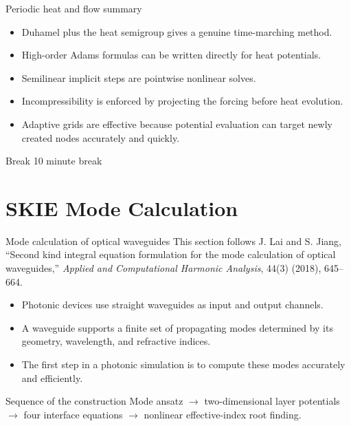 \documentclass[aspectratio=169,10pt]{beamer}
\begin{document}
\begin{frame}{Periodic heat and flow summary}
\small
\begin{itemize}
  \item Duhamel plus the heat semigroup gives a genuine time-marching method.
  \item High-order Adams formulas can be written directly for heat potentials.
  \item Semilinear implicit steps are pointwise nonlinear solves.
  \item Incompressibility is enforced by projecting the forcing before heat
  evolution.
  \item Adaptive grids are effective because potential evaluation can target
  newly created nodes accurately and quickly.
\end{itemize}

\end{frame}

\begin{frame}{Break}
\centering
\Large 10 minute break
\end{frame}

\section{SKIE Mode Calculation}

\begin{frame}{Mode calculation of optical waveguides}
\small
This section follows J. Lai and S. Jiang, ``Second kind integral equation
formulation for the mode calculation of optical waveguides,'' \emph{Applied
and Computational Harmonic Analysis}, 44(3) (2018), 645--664.

\begin{itemize}
  \item Photonic devices use straight waveguides as input and output channels.
  \item A waveguide supports a finite set of propagating modes determined by
  its geometry, wavelength, and refractive indices.
  \item The first step in a photonic simulation is to compute these modes
  accurately and efficiently.
\end{itemize}

\begin{block}{Sequence of the construction}
Mode ansatz $\longrightarrow$ two-dimensional layer potentials
$\longrightarrow$ four interface equations $\longrightarrow$ nonlinear
effective-index root finding.
\end{block}
\end{frame}
\end{document}
